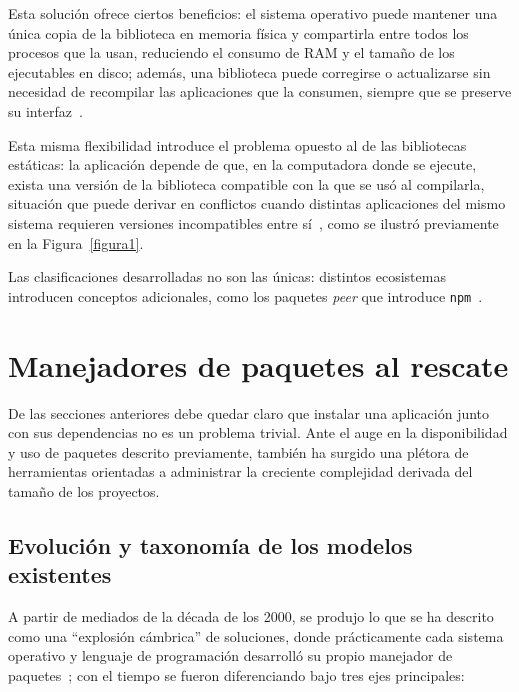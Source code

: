 Esta solución ofrece ciertos beneficios: el sistema operativo puede mantener una única copia de la biblioteca en memoria física y compartirla entre todos los procesos que la usan, reduciendo el consumo de RAM y el tamaño de los ejecutables en disco; además, una biblioteca puede corregirse o actualizarse sin necesidad de recompilar las aplicaciones que la consumen, siempre que se preserve su interfaz~\cite{roucariesStaticLinkingPitfalls2025}.

Esta misma flexibilidad introduce el problema opuesto al de las bibliotecas estáticas: la aplicación depende de que, en la computadora donde se ejecute, exista una versión de la biblioteca compatible con la que se usó al compilarla, situación que puede derivar en conflictos cuando distintas aplicaciones del mismo sistema requieren versiones incompatibles entre sí~\cite{roucariesStaticLinkingPitfalls2025}, como se ilustró previamente en la Figura~\ref{figura1}.

Las clasificaciones desarrolladas no son las únicas: distintos ecosistemas introducen conceptos adicionales, como los paquetes \emph{peer} que introduce \texttt{npm}~\cite{Gibb2026}.

\section{Manejadores de paquetes al rescate}\label{manejadores_de_paquetes}

De las secciones anteriores debe quedar claro que instalar una aplicación junto con sus dependencias no es un problema trivial. Ante el auge en la disponibilidad y uso de paquetes descrito previamente, también ha surgido una plétora de herramientas orientadas a administrar la creciente complejidad derivada del tamaño de los proyectos.

\subsection{Evolución y taxonomía de los modelos existentes}

A partir de mediados de la década de los 2000, se produjo lo que se ha descrito como una ``explosión cámbrica'' de soluciones, donde prácticamente cada sistema operativo y lenguaje de programación desarrolló su propio manejador de paquetes~\cite{Gibb2026}; con el tiempo se fueron diferenciando bajo tres ejes principales:

